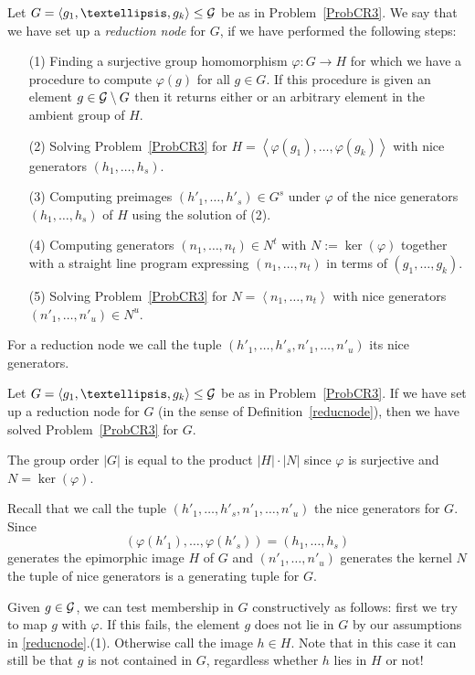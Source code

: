 \begin{Def}
\label{reducnode}
Let $G = \left< g_1, \ldots, g_k \right> \le \GG$ be as in 
Problem~\ref{ProbCR3}.
We say that we have set up a \emph{reduction node} for $G$, if we have
performed the following steps:
\begin{itemize}
\item[(1)] Finding a surjective group homomorphism $\varphi : G \to H$ for
which we have a procedure to compute $\varphi(g)$ for all $g \in G$.
If this procedure is given an element $g \in \mathcal{G} \setminus G$ then it
returns either {\fail} or an arbitrary element in the ambient group of $H$.
\item[(2)] Solving Problem~\ref{ProbCR3} for $H = \left< \varphi(g_1),
\ldots, \varphi(g_k) \right>$ with nice generators $(h_1, \ldots, h_s)$.
\item[(3)] Computing preimages $(h'_1, \ldots, h'_s) \in G^s$ under $\varphi$
of the nice generators $(h_1, \ldots, h_s)$ of $H$ using the solution
of (2).
\item[(4)] Computing generators $(n_1, \ldots, n_t) \in N^t$ with $N :=
\ker(\varphi)$ together with a straight line program expressing
$(n_1, \ldots, n_t)$ in terms of $(g_1, \ldots, g_k)$.
\item[(5)] Solving Problem~\ref{ProbCR3} for $N = \left< n_1, \ldots, n_t
\right>$ with nice generators $(n'_1, \ldots, n'_u) \in N^u$.
\end{itemize}
For a reduction node we call the tuple $(h'_1, \ldots, h'_s, n'_1, \ldots,
n'_u)$ its nice generators.
\end{Def}

\begin{Prop}
Let $G = \left< g_1, \ldots, g_k \right> \le \GG$ be as in 
Problem~\ref{ProbCR3}.
If we have set up a reduction node for $G$ (in the sense of
Definition~\ref{reducnode}), then we have solved
Problem~\ref{ProbCR3} for $G$.
\end{Prop}
\proofbeg
The group order $|G|$ is equal to the product $|H| \cdot |N|$ since
$\varphi$ is surjective and $N = \ker(\varphi)$.

Recall that we call the tuple $(h'_1, \ldots, h'_s, n'_1, \ldots, n'_u)$
the nice generators for $G$. Since 
\[ (\varphi(h'_1), \ldots, \varphi(h'_s))
= (h_1, \ldots, h_s) \] 
generates the epimorphic image $H$ of $G$ and
$(n'_1, \ldots, n'_u)$ generates the kernel $N$ the tuple of nice
generators is a generating tuple for $G$.

Given $g \in \mathcal{G}$, we can test membership in $G$ constructively as follows:
first we try to map $g$ with $\varphi$. If this fails, the element $g$
does not lie in $G$ by our assumptions in \ref{reducnode}.(1). Otherwise
call the image $h \in H$. Note that in this case it can still be that
$g$ is not contained in $G$, regardless whether $h$ lies in $H$ or not! 

